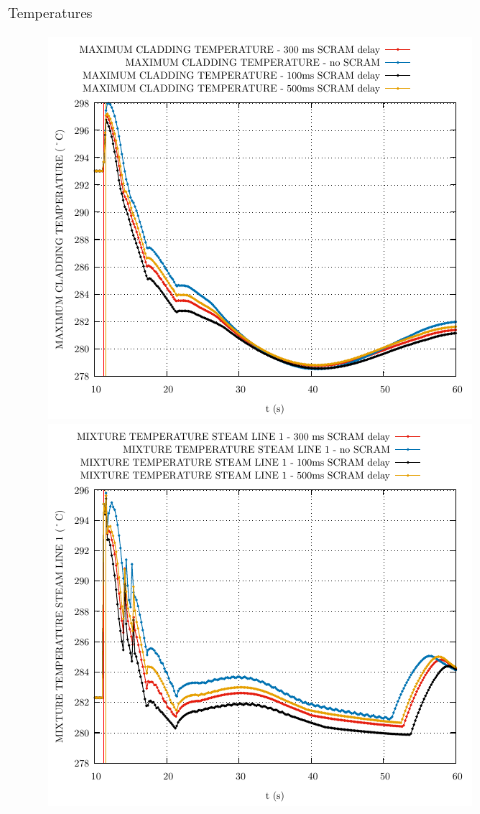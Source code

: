 \begin{frame}{Temperatures}
\begin{figure}
\begin{minipage}{.5\textwidth}
			\includegraphics[width=0.7\linewidth]{./graphs/MAXIMUM CLADDING TEMPERATURE_comp.pdf}
		\end{minipage}%
		\begin{minipage}{.5\textwidth}
			
			
			\centering
			\includegraphics[width=.7\linewidth]{./graphs/MIXTURE TEMPERATURE STEAM LINE 1_comp.pdf}
		\end{minipage}
	\end{figure}
\end{frame}

